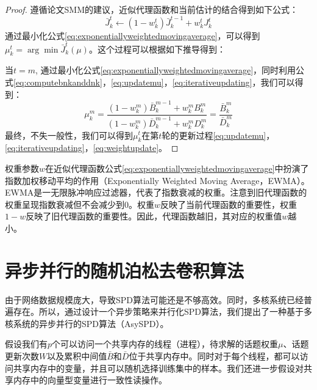 \begin{proof}
    遵循论文SMM\citep{mairal-2013-SMM}的建议，近似代理函数和当前估计的结合得到如下公式：
    \begin{equation} \label{eq:exponentiallyweightedmovingaverage}
    \bar{J}^t_k \leftarrow (1-w^t_k)\bar{J}^{t-1}_k + w^t_k J^t_k
	\end{equation}
	通过最小化公式\eqref{eq:exponentiallyweightedmovingaverage}，可以得到$\mu^t_k = \arg \min \bar{J}^t_k(\mu)$。这个过程可以根据如下推导得到：

	当$t=m$, 通过最小化公式\eqref{eq:exponentiallyweightedmovingaverage}，同时利用公式\eqref{eq:computebnkanddnk}，\eqref{eq:updatemu}，\eqref{eq:iterativeupdating}，我们可以得到：
	\begin{equation}
	\mu^m_k = \frac{(1-w^m_k)\bar{B}^{m-1}_k+w^m_kB^m_k}{(1-w^m_k)\bar{D}^{m-1}_k+w^m_kD^m_k} = \frac{\bar{B}^m_k}{\bar{D}^m_k}
	\end{equation}
	最终，不失一般性，我们可以得到$\mu^t_k$在第$t$轮的更新过程\eqref{eq:updatemu}，\eqref{eq:iterativeupdating}，\eqref{eq:weightupdate}。
\end{proof}

权重参数$w$在近似代理函数公式\eqref{eq:exponentiallyweightedmovingaverage}中扮演了指数加权移动平均的作用（Exponentially Weighted Moving Average，EWMA）。EWMA是一无限脉冲响应过滤器，代表了指数衰减的权重。注意到旧代理函数的权重呈现指数衰减但不会减少到0。权重$w$反映了当前代理函数的重要性，权重$1-w$反映了旧代理函数的重要性。因此，代理函数越旧，其对应的权重值$w$越小。

\section{异步并行的随机泊松去卷积算法}

由于网络数据规模庞大，导致SPD算法可能还是不够高效。同时，多核系统已经普遍存在。所以，通过设计一个异步策略来并行化SPD算法，我们提出了一种基于多核系统的异步并行的SPD算法（AsySPD）。

假设我们有$p$个可以访问一个共享内存的线程（进程），待求解的话题权重$\mu$、话题更新次数$W$以及累积中间值$\bar{B}$和$\bar{D}$位于共享内存中。同时对于每个线程，都可以访问共享内存中的变量，并且可以随机选择训练集中的样本。我们还进一步假设对共享内存中的向量型变量进行一致性读操作。

